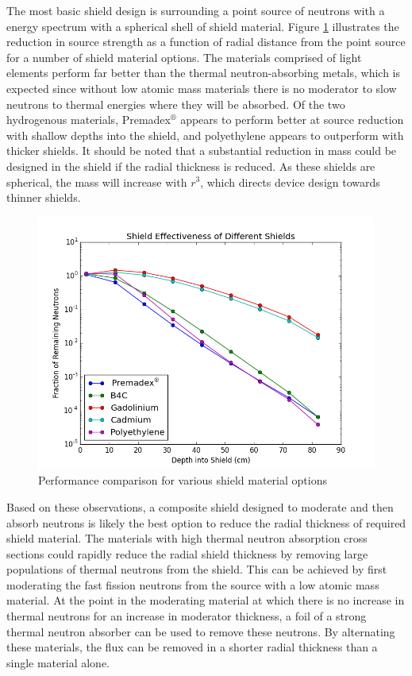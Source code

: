 \documentclass{mc2015}
\begin{document}
The most basic shield design is surrounding a point source of neutrons with a  energy spectrum with a spherical shell of shield material. Figure \ref{fig:basics} illustrates the reduction in source strength as a function of radial distance from the point source for a number of shield material options. %
The materials comprised of light elements perform far better than the thermal neutron-absorbing metals, which is expected since without low atomic mass materials there is no moderator to slow neutrons to thermal energies where they will be absorbed. Of the two hydrogenous materials, Premadex$^\circledR$ appears to perform better at source reduction with shallow depths into the shield, and polyethylene appears to outperform with thicker shields. It should be noted that a substantial reduction in mass could be designed in the shield if the radial thickness is reduced. As these shields are spherical, the mass will increase with $r^3$, which directs device design towards thinner shields.  


\begin{figure}
  \centering
  \includegraphics[width=4.5in]{Basics3.png}
  \caption{Performance comparison for various shield material options}
  \label{fig:basics}
\end{figure}

Based on these observations, a composite shield designed to moderate and then absorb neutrons is likely the best option to reduce the radial thickness of required shield material. The materials with high thermal neutron absorption cross sections could rapidly reduce the radial shield thickness by removing large populations of thermal neutrons from the shield. This can be achieved by first moderating the fast fission neutrons from the  source with a low atomic mass material. At the point in the moderating material at which there is no increase in thermal neutrons for an increase in moderator thickness, a foil of a strong thermal neutron absorber can be used to remove these neutrons. By alternating these materials, the flux can be removed in a shorter radial thickness than a single material alone. 
\end{document}
